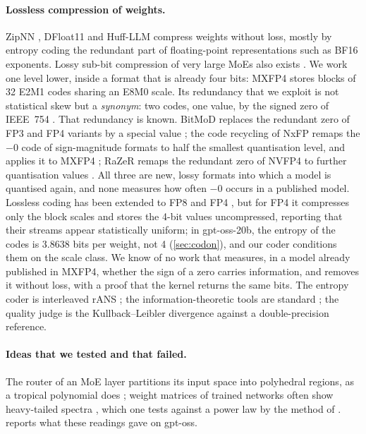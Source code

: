 \documentclass[11pt, a4paper]{article}
\theoremstyle{remark}
\begin{document}
\paragraph{Lossless compression of weights.} ZipNN \citep{hershcovitch2024zipnn}, DFloat11 \citep{zhang2025dfloat11} and Huff-LLM \citep{yubeaton2025huffllm} compress weights without loss, mostly by entropy coding the redundant part of floating-point representations such as BF16 exponents. Lossy sub-bit compression of very large MoEs also exists \citep{frantar2023qmoe}. We work one level lower, inside a format that is already four bits: MXFP4 \citep{ocpmx2023,rouhani2023microscaling} stores blocks of 32 E2M1 codes sharing an E8M0 scale. Its redundancy that we exploit is not statistical skew but a \emph{synonym}: two codes, one value, by the signed zero of IEEE~754 \citep{ieee754}. That redundancy is known. BitMoD replaces the redundant zero of FP3 and FP4 variants by a special value \citep{chen2024bitmod}; the code recycling of NxFP remaps the $-0$ code of sign-magnitude formats to half the smallest quantisation level, and applies it to MXFP4 \citep{lo2024nxfp}; RaZeR remaps the redundant zero of NVFP4 to further quantisation values \citep{chen2025razer}. All three are new, lossy formats into which a model is quantised again, and none measures how often $-0$ occurs in a published model. Lossless coding has been extended to FP8 and FP4 \citep{heilper2025lossless}, but for FP4 it compresses only the block scales and stores the 4-bit values uncompressed, reporting that their streams appear statistically uniform; in gpt-oss-20b, the entropy of the codes is 3.8638 bits per weight, not 4 (\cref{sec:codon}), and our coder conditions them on the scale class. We know of no work that measures, in a model already published in MXFP4, whether the sign of a zero carries information, and removes it without loss, with a proof that the kernel returns the same bits. The entropy coder is interleaved rANS \citep{duda2013ans,giesen2014interleaved}; the information-theoretic tools are standard \citep{cover2006}; the quality judge is the Kullback--Leibler divergence \citep{kullback1951} against a double-precision reference.

\paragraph{Ideas that we tested and that failed.} The router of an MoE layer partitions its input space into polyhedral regions, as a tropical polynomial does \citep{zhang2018tropical}; weight matrices of trained networks often show heavy-tailed spectra \citep{martin2018implicit}, which one tests against a power law by the method of \citet{clauset2009power}.  reports what these readings gave on gpt-oss.
\end{document}
